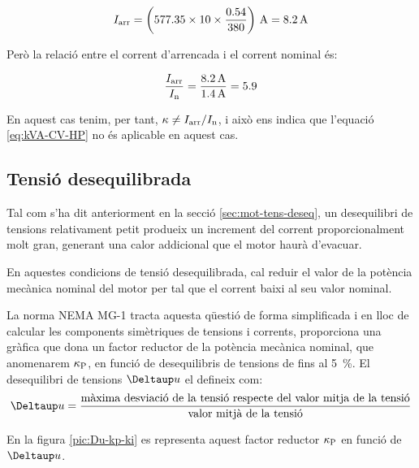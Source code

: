 \begin{exemple}[\MotorArrencNEMA{}]
    \[
      I\ped{arr} = \left(\num{577,35} \times 10 \times \frac{\num{0,54}}{380}\right) \,\unit{A} = \qty{8,2}{A}
    \]

    Però la relació entre el corrent d'arrencada i el corrent nominal és:
    
    \[
        \frac{I_\mathrm{arr}}{I_\mathrm{n}} = \frac{\qty{8,2}{A}}{\qty{1,4}{A}} = \num{5,9}
    \]

    En aquest cas tenim, per tant, $\kappa \neq I_\mathrm{arr}/I_\mathrm{n}$, i això ens indica que l'equació \eqref{eq:kVA-CV-HP} no és aplicable en aquest cas.
\end{exemple}

\subsection{Tensió desequilibrada}\label{sec:NEMA-U-deseq}

Tal com s'ha dit anteriorment en la secció \ref{sec:mot-tens-deseq}, un desequilibri de tensions relativament petit produeix un increment del corrent proporcionalment molt gran, generant una  calor addicional que el motor haurà d'evacuar.

En aquestes condicions de tensió desequilibrada, cal reduir el valor de la potència mecànica nominal del motor per tal que el corrent baixi al seu valor nominal.

La norma NEMA MG-1 tracta aquesta qüestió de forma simplificada i en lloc de calcular les components simètriques de tensions i corrents, proporciona una gràfica que dona un factor reductor de la potència mecànica nominal, que anomenarem $\kappa_\mathrm{P}$, en funció de desequilibris de tensions de fins al \qty{5}{\%}. El desequilibri de tensions $\Deltaup u$ el defineix com:
\[
    \Deltaup u = \frac{\text{màxima desviació de la tensió respecte del valor mitja de la tensió}}{\text{valor mitjà de la tensió}}
\]

En la figura \vref{pic:Du-kp-ki} es representa aquest factor reductor $\kappa_\mathrm{P}$ en funció de $\Deltaup u$.

\begin{center}
    
    \label{pic:Du-kp-ki}
\end{center}



